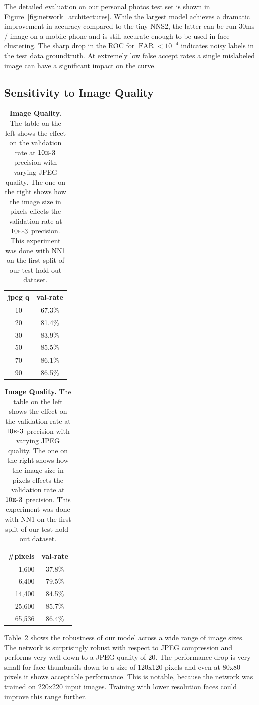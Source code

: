 \documentclass[10pt,twocolumn,letterpaper]{article}
\DeclareMathOperator{\far}{FAR}
\begin{document}
The detailed evaluation on our personal photos
test set is shown in Figure~\ref{fig:network_architectures}. While the largest
model achieves a dramatic improvement in accuracy compared to the tiny
NNS2, the latter can be run 30ms / image on a mobile phone and is still accurate
enough to be used in face clustering. The sharp drop in the ROC for
$\far<10^{-4}$ indicates noisy labels in the test data groundtruth. At extremely
low false accept rates a single mislabeled image can have a significant impact
on the curve.

\subsection{Sensitivity to Image Quality}

\begin{table}
\begin{center}
\begin{tabular}{|c|c|}
\hline
jpeg q & val-rate \\
\hline\hline
10 & 67.3\% \\
20 & 81.4\% \\
30 & 83.9\% \\
50 & 85.5\% \\
70 & 86.1\% \\
90 & 86.5\% \\
\hline
\end{tabular}
\hspace{.5cm}
\begin{tabular}{|r|c|}
\hline
\#pixels & val-rate \\
\hline\hline
1,600 & 37.8\% \\
6,400 & 79.5\% \\
14,400 & 84.5\% \\
25,600 & 85.7\% \\
65,536 & 86.4\% \\
\hline
\end{tabular}
\end{center}
\caption{{\bf Image Quality.} The table on the left shows the effect on the
  validation rate at $10\text{\sc{e}-3}$ precision with varying JPEG quality.
  The one on the right shows how the image size in pixels effects the
  validation rate at $10\text{\sc{e}-3}$ precision. This experiment was done
  with NN1 on the first split of our test hold-out dataset.}
\label{tab:image_quality}
\end{table}

Table~\ref{tab:image_quality} shows the robustness of our model across a wide
range of image sizes. The network is surprisingly robust with respect to JPEG
compression and performs very well down to a JPEG quality of 20. The performance
drop is very small for face thumbnails down to a size of 120x120 pixels and
even at 80x80 pixels it shows acceptable performance. This is notable, because
the network was trained on 220x220 input images. Training with lower resolution
faces could improve this range further.
\end{document}
